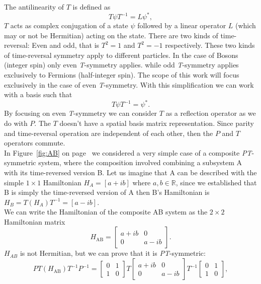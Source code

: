 \documentclass[10pt, a4paper, singlespacing, headsepline]{article}
\newcommand\PT{\textit{PT}}
\newcommand\TT{\textit{T}}
\begin{document}
The antilinearity of $T$ is defined as 
\begin{equation} \label{eq:3}
T \psi T^{-1}= L \psi^{*},
\end{equation}  
$T$ acts as complex conjugation of a state $\psi$ followed by a linear operator $L$ (which may or not be Hermitian) acting on the state. There are two kinds of time-reversal: Even and odd, that is $T^2 = 1$ and $T^2 = -1$ respectively. These two kinds of time-reversal symmetry apply to different particles. In the case of Bosons (integer spin) only even \TT-symmetry applies. while odd \TT-symmetry applies exclusively to Fermions (half-integer spin)\cite{Jones-Smith}.
The scope of this work will focus exclusively in the case of even \TT-symmetry. With this simplification we can work with a basis such that 
\begin{equation} \label{eq:4}
T \psi T^{-1} = \psi^{*}.
\end{equation}
By focusing on even \TT-symmetry we can consider $T$ as a reflection operator as we do with $P$. The $T$ doesn't have a spatial basis matrix representation.
Since parity and time-reversal operation are independent of each other, then the $P$ and $T$ operators commute\cite{BenderPT}.\\
In Figure~\ref{fig:AB} on page~\pageref{fig:AB} we considered a very simple case of a composite \PT-symmetric system, where the composition involved combining a subsystem A with its time-reversed version B.
Let us imagine that A can be described with the simple $1 \times 1 $ Hamiltonian $H_{A} = [a+ib]$ where $a, b \in \mathds{R}$, since we established that B is simply the time-reversed version of A then B's Hamiltonian is $H_{B} = T (H_{A}) T^{-1} = [a-ib]$.\\
We can write the Hamiltonian of the composite AB system as the $2 \times 2$ Hamiltonian matrix
\begin{equation} \label{eq:5}
H_{\mathrm{AB}} = \begin{bmatrix}
a+ib & 0 \\ 
0 & a-ib
\end{bmatrix}.
\end{equation}
$H_{AB}$ is not Hermitian, but we can prove that it is \PT-symmetric:
\begin{equation} \label{eq:6}
PT(H_{\mathrm{AB}})T^{-1}P^{-1} = \begin{bmatrix}
0 & 1 \\ 
1 & 0
\end{bmatrix}
T
\begin{bmatrix}
a+ib & 0 \\ 
0 & a-ib
\end{bmatrix}
T^{-1}
\begin{bmatrix}
0 & 1 \\ 
1 & 0
\end{bmatrix},
\end{equation}
\end{document}
